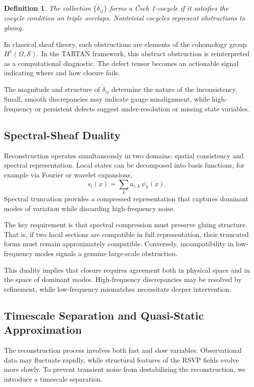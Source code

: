 \documentclass[12pt, oneside]{article}
\newtheorem{definition}{Definition}
\begin{document}
\begin{definition}
The collection $\{\check{\delta}_{ij}\}$ forms a \v{C}ech 1-cocycle if it satisfies the cocycle condition on triple overlaps. Nontrivial cocycles represent obstructions to gluing.
\end{definition}

In classical sheaf theory, such obstructions are elements of the cohomology group $H^1(\Omega, \mathcal{S})$. In the TARTAN framework, this abstract obstruction is reinterpreted as a computational diagnostic. The defect tensor becomes an actionable signal indicating where and how closure fails.

The magnitude and structure of $\check{\delta}_{ij}$ determine the nature of the inconsistency. Small, smooth discrepancies may indicate gauge misalignment, while high-frequency or persistent defects suggest under-resolution or missing state variables.

\subsection{Spectral-Sheaf Duality}

Reconstruction operates simultaneously in two domains: spatial consistency and spectral representation. Local states can be decomposed into basis functions, for example via Fourier or wavelet expansions,
\[
s_i(x) = \sum_{k} a_{i,k} \, \psi_k(x).
\]
Spectral truncation provides a compressed representation that captures dominant modes of variation while discarding high-frequency noise.

The key requirement is that spectral compression must preserve gluing structure. That is, if two local sections are compatible in full representation, their truncated forms must remain approximately compatible. Conversely, incompatibility in low-frequency modes signals a genuine large-scale obstruction.

This duality implies that closure requires agreement both in physical space and in the space of dominant modes. High-frequency discrepancies may be resolved by refinement, while low-frequency mismatches necessitate deeper intervention.

\subsection{Timescale Separation and Quasi-Static Approximation}

The reconstruction process involves both fast and slow variables. Observational data may fluctuate rapidly, while structural features of the RSVP fields evolve more slowly. To prevent transient noise from destabilizing the reconstruction, we introduce a timescale separation.
\end{document}
